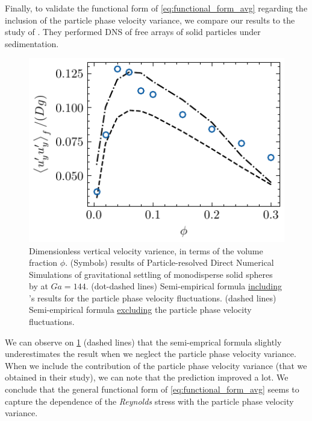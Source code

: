 Finally, to validate the functional form of \ref{eq:functional_form_avg} regarding the inclusion of the particle phase velocity variance, we compare our results to the study of \citet{shajahan2023inertial}. 
They performed DNS of free arrays of solid particles under sedimentation.  
\begin{figure}
    \centering
    \includegraphics[height = 0.25\textwidth]{image/HOMOGENEOUS_final/CA/tariq.pdf}
    \caption{Dimensionless vertical velocity varience, in terms of the volume fraction $\phi$. 
    (Symbols) results of Particle-resolved Direct Numerical Simulations  of gravitational settling of monodisperse solid spheres by \citet{shajahan2023inertial} at $Ga = 144$. 
    (dot-dashed lines) Semi-empirical formula \underline{including} \citet{shajahan2023inertial}'s results for the particle phase velocity fluctuations. 
    (dashed lines) Semi-empirical formula \underline{excluding} the particle phase velocity fluctuations. 
    }
    \label{fig:tariq}
\end{figure}
We can observe on \ref{fig:tariq} (dashed lines) that the semi-emprical formula slightly underestimates the result when we neglect the particle phase velocity variance. 
When we include the contribution of the particle phase velocity variance (that we obtained in their study), we can note that the prediction improved a lot. 
We conclude that the general functional form of \ref{eq:functional_form_avg} seems to capture the dependence of the \textit{Reynolds} stress with the particle phase velocity variance. 
